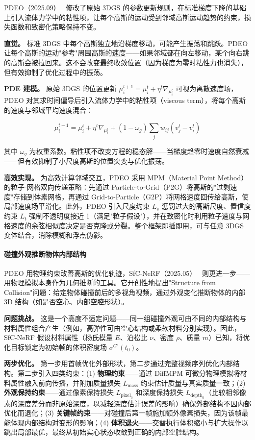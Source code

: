 PDEO（2025.09）~\cite{2509_13938} 修改了原始 3DGS 的参数更新规则，在标准梯度下降的基础上引入流体力学中的粘性项，让每个高斯的运动受到邻域高斯运动趋势的约束，损失函数和致密化策略保持不变。

\textbf{直觉。} 标准 3DGS 中每个高斯独立地沿梯度移动，可能产生振荡和跳跃。PDEO 让每个高斯的运动"参考"周围高斯的速度——如果邻域都在向左移动，某个向右跳的高斯会被拉回来。这不会改变最终收敛位置（因为梯度为零时粘性力也消失），但有效抑制了优化过程中的振荡。

\textbf{PDE 建模。} 原始 3DGS 的位置更新 $\mu_i^{t+1} = \mu_i^t + \eta^t \nabla_{\mu_i^t}$ 可视为离散速度场，PDEO 对其求时间偏导后引入流体力学中的粘性项（viscous term），将每个高斯的速度与邻域平均速度混合：

\begin{equation}
\mu_i^{t+1} = \mu_i^t + \eta^t \nabla_{\mu_i^t} + (1{-}\omega_g)\sum_{j} w_{ij}(v_j^t - v_i^t)
\end{equation}

其中 $\omega_g$ 为权重系数。粘性项不改变方程的稳态解——当梯度趋零时速度自然衰减——但有效抑制了小尺度高斯的位置突变与优化振荡。

\textbf{高效实现。} 为高效计算邻域交互，PDEO 采用 MPM（Material Point Method）的粒子-网格双向传递策略：先通过 Particle-to-Grid（P2G）将高斯的"过剩速度"存储到体素网格，再通过 Grid-to-Particle（G2P）将网格速度回传给高斯，使局部速度场平滑化。此外，PDEO 引入尺度约束 $L_s$ 惩罚过大的高斯尺度、置信度约束 $L_t$ 强制不透明度接近 1（满足"粒子假设"），并在致密化时利用粒子速度与网格速度的余弦相似度决定是否克隆或分裂。整个框架即插即用，可与任意 3DGS 变体结合，消除模糊和浮点伪影。

\paragraph{碰撞外观推断物体内部结构}

PDEO 用物理约束改善高斯的优化轨迹，SfC-NeRF（2025.05）~\cite{2505_21335} 则更进一步——用物理模拟本身作为几何推断的工具。它开创性地提出"Structure from Collision"问题：给定物体碰撞前后的多视角视频，通过外观变化推断物体的内部 3D 结构（如是否空心、内部空腔形状）。

\textbf{问题挑战。} 这是一个高度不适定问题——同一组碰撞外观可由不同的内部结构与材料属性组合产生（例如，高弹性可由空心结构或柔软材料分别实现）。因此，SfC-NeRF 假设材料属性（杨氏模量 $E$、泊松比 $\nu$、密度 $\rho$、质量 $m$）已知，将优化目标锁定为初始帧的体积密度场 $\sigma^{G'}(t_0)$。

\textbf{两步优化。} 第一步用首帧优化外部形状，第二步通过完整视频序列优化内部结构。第二步引入四类约束：(1) \textbf{物理约束}——通过 DiffMPM 可微分物理模拟将材料属性融入前向传播，并附加质量损失 $L_{\text{mass}}$ 约束估计质量与真实质量一致；(2) \textbf{外观保持约束}——通过像素保持损失 $L_{\text{pixel}_0}$ 和深度保持损失 $L_{\text{depth}_0}$（比较相邻像素的深度差分而非原始深度，以减轻深度估计误差的影响）确保外部结构不因内部优化而退化；(3) \textbf{关键帧约束}——对碰撞后第一帧施加额外像素损失，因为该帧最能体现内部结构对变形的影响；(4) \textbf{体积退火}——交替执行体积缩小与扩大操作以跳出局部最优，最终从初始实心状态收敛到正确的内部空腔结构。

